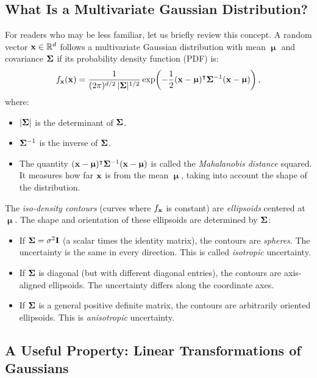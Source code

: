 \documentclass[11pt, letterpaper]{article}
\newcommand{\bSigma}{\vb{\Sigma}}
\newcommand{\bmu}{\boldsymbol{\upmu}}
\newcommand{\R}{\mathbb{R}}
\begin{document}
\subsection{What Is a Multivariate Gaussian Distribution?}

For readers who may be less familiar, let us briefly review this concept. A random vector $\vb{x} \in \R^d$ follows a multivariate Gaussian distribution with mean $\bmu$ and covariance $\bSigma$ if its probability density function (PDF) is:
\begin{equation}\label{eq:gaussian_pdf}
    f_{\vb{x}}(\vb{x}) = \frac{1}{(2\pi)^{d/2}\, |\bSigma|^{1/2}} \exp\!\left(-\frac{1}{2}(\vb{x} - \bmu)^{\intercal} \bSigma^{-1} (\vb{x} - \bmu)\right),
\end{equation}
where:
\begin{itemize}[leftmargin=2em]
    \item $|\bSigma|$ is the determinant of $\bSigma$.
    \item $\bSigma^{-1}$ is the inverse of $\bSigma$.
    \item The quantity $(\vb{x} - \bmu)^{\intercal} \bSigma^{-1} (\vb{x} - \bmu)$ is called the \emph{Mahalanobis distance} squared. It measures how far $\vb{x}$ is from the mean $\bmu$, taking into account the shape of the distribution.
\end{itemize}
The \emph{iso-density contours} (curves where $f_{\vb{x}}$ is constant) are \emph{ellipsoids} centered at $\bmu$. The shape and orientation of these ellipsoids are determined by $\bSigma$:
\begin{itemize}[leftmargin=2em]
    \item If $\bSigma = \sigma^2 \vb{I}$ (a scalar times the identity matrix), the contours are \emph{spheres}. The uncertainty is the same in every direction. This is called \emph{isotropic} uncertainty.
    \item If $\bSigma$ is diagonal (but with different diagonal entries), the contours are axis-aligned ellipsoids. The uncertainty differs along the coordinate axes.
    \item If $\bSigma$ is a general positive definite matrix, the contours are arbitrarily oriented ellipsoids. This is \emph{anisotropic} uncertainty.
\end{itemize}

\subsection{A Useful Property: Linear Transformations of Gaussians}\label{sec:linear_transform_gaussian}
\end{document}
